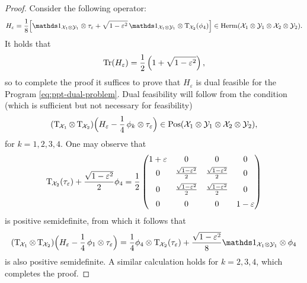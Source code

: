 \begin{proof}

  
  Consider the following operator:
  \begin{equation}
    H_{\varepsilon} = \frac{1}{8}
    \Bigl[
      \I_{\X_1 \otimes \Y_1} \otimes \tau_{\varepsilon}
      + \sqrt{1 - \varepsilon^2}\,
      \I_{\X_1 \otimes \Y_1} \otimes \pt_{\negsmallspace\X_2}(\phi_4)
      \Bigr] \in \Herm(\X_1\otimes\Y_1\otimes\X_2\otimes\Y_2).
  \end{equation}
  It holds that
  \begin{equation}
    \operatorname{Tr}(H_{\varepsilon}) = \frac{1}{2}\left( 1 + \sqrt{1-\varepsilon^2} \right),
  \end{equation}
  so to complete the proof it suffices to prove that $H_{\varepsilon}$ is
  dual feasible for the Program \eqref{eq:ppt-dual-problem}.
  Dual feasibility will follow from the condition (which is sufficient but not necessary for feasibility)
  \begin{equation}
    (\operatorname{T}_{\mspace{-1.5mu}\mathcal{X}_1} \otimes \operatorname{T}_{\mspace{-1.5mu}\mathcal{X}_2})
    \Bigl(
    H_{\varepsilon} - \frac{1}{4}\,\phi_k\otimes\tau_{\varepsilon}\Bigr)
    \in\mathrm{Pos}(\mathcal{X}_1\otimes\mathcal{Y}_1\otimes\mathcal{X}_2\otimes\mathcal{Y}_2),
  \end{equation}
  for $k = 1,2,3,4$.
  One may observe that
  \begin{equation}
    \operatorname{T}_{\mspace{-1.5mu}\mathcal{X}_2}(\tau_{\varepsilon}) 
    + \frac{\sqrt{1-\varepsilon^2}}{2}\phi_4
    = \frac{1}{2}
    \begin{pmatrix}
      1 + \varepsilon & 0 & 0 & 0\\[1mm]
      0 & \frac{\sqrt{1 - \varepsilon^2}}{2} 
      & \frac{\sqrt{1 - \varepsilon^2}}{2} & 0\\[2mm]
      0 & \frac{\sqrt{1 - \varepsilon^2}}{2} 
      & \frac{\sqrt{1 - \varepsilon^2}}{2} & 0\\[2mm]
      0 & 0 & 0 & 1 - \varepsilon
    \end{pmatrix}
  \end{equation}
  is positive semidefinite, from which it follows that
  \begin{equation}
    (\pt_{\negsmallspace\X_1} \otimes \pt_{\negsmallspace\X_2})
    \Bigl(
    H_{\varepsilon} - \frac{1}{4}\,\phi_1\otimes\tau_{\varepsilon}\Bigr)
    = \frac{1}{4} \phi_4 \otimes \pt_{\negsmallspace\X_2}(\tau_{\varepsilon})
    + \frac{\sqrt{1 - \varepsilon^2}}{8} \I_{\X_1\otimes\Y_1} \otimes \phi_4
  \end{equation}
  is also positive semidefinite.
  A similar calculation holds for $k=2,3,4$, which completes the proof.
\end{proof}

